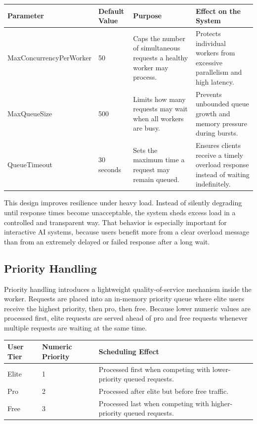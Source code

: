 \begin{table}[H]
  \centering
  \renewcommand{\arraystretch}{1.2}
  \begin{tabularx}{\textwidth}{@{}l l X X@{}}
    \toprule
    \textbf{Parameter} & \textbf{Default Value} & \textbf{Purpose} & \textbf{Effect on the System} \\
    \midrule
    MaxConcurrencyPerWorker & 50 & Caps the number of simultaneous requests a healthy worker may process. & Protects individual workers from excessive parallelism and high latency. \\
    MaxQueueSize & 500 & Limits how many requests may wait when all workers are busy. & Prevents unbounded queue growth and memory pressure during bursts. \\
    QueueTimeout & 30 seconds & Sets the maximum time a request may remain queued. & Ensures clients receive a timely overload response instead of waiting indefinitely. \\
    \bottomrule
  \end{tabularx}
\end{table}

This design improves resilience under heavy load. Instead of silently degrading until response times become unacceptable, the system sheds excess load in a controlled and transparent way. That behavior is especially important for interactive AI systems, because users benefit more from a clear overload message than from an extremely delayed or failed response after a long wait.

\subsection{Priority Handling}
Priority handling introduces a lightweight quality-of-service mechanism inside the worker. Requests are placed into an in-memory priority queue where elite users receive the highest priority, then pro, then free. Because lower numeric values are processed first, elite requests are served ahead of pro and free requests whenever multiple requests are waiting at the same time.

\begin{table}[H]
  \centering
  \renewcommand{\arraystretch}{1.2}
  \begin{tabularx}{\textwidth}{@{}l l X@{}}
    \toprule
    \textbf{User Tier} & \textbf{Numeric Priority} & \textbf{Scheduling Effect} \\
    \midrule
    Elite & 1 & Processed first when competing with lower-priority queued requests. \\
    Pro & 2 & Processed after elite but before free traffic. \\
    Free & 3 & Processed last when competing with higher-priority queued requests. \\
    \bottomrule
  \end{tabularx}
\end{table}

